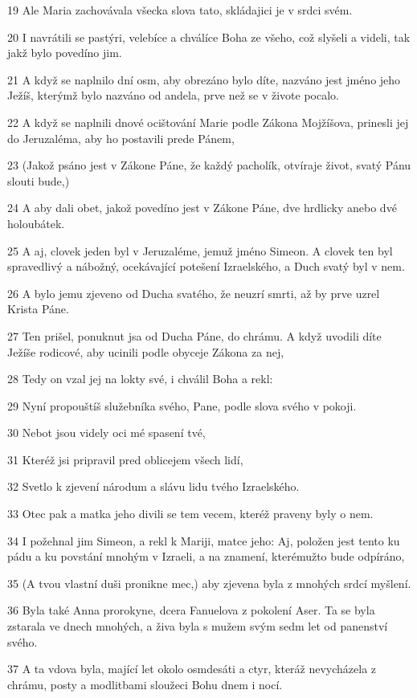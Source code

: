 \par 19 Ale Maria zachovávala všecka slova tato, skládajici je v srdci svém.
\par 20 I navrátili se pastýri, velebíce a chválíce Boha ze všeho, což slyšeli a videli, tak jakž bylo povedíno jim.
\par 21 A když se naplnilo dní osm, aby obrezáno bylo díte, nazváno jest jméno jeho Ježíš, kterýmž bylo nazváno od andela, prve než se v živote pocalo.
\par 22 A když se naplnili dnové ocištování Marie podle Zákona Mojžíšova, prinesli jej do Jeruzaléma, aby ho postavili prede Pánem,
\par 23 (Jakož psáno jest v Zákone Páne, že každý pacholík, otvíraje život, svatý Pánu slouti bude,)
\par 24 A aby dali obet, jakož povedíno jest v Zákone Páne, dve hrdlicky anebo dvé holoubátek.
\par 25 A aj, clovek jeden byl v Jeruzaléme, jemuž jméno Simeon. A clovek ten byl spravedlivý a nábožný, ocekávající potešení Izraelského, a Duch svatý byl v nem.
\par 26 A bylo jemu zjeveno od Ducha svatého, že neuzrí smrti, až by prve uzrel Krista Páne.
\par 27 Ten prišel, ponuknut jsa od Ducha Páne, do chrámu. A když uvodili díte Ježíše rodicové, aby ucinili podle obyceje Zákona za nej,
\par 28 Tedy on vzal jej na lokty své, i chválil Boha a rekl:
\par 29 Nyní propouštíš služebníka svého, Pane, podle slova svého v pokoji.
\par 30 Nebot jsou videly oci mé spasení tvé,
\par 31 Kteréž jsi pripravil pred oblicejem všech lidí,
\par 32 Svetlo k zjevení národum a slávu lidu tvého Izraelského.
\par 33 Otec pak a matka jeho divili se tem vecem, kteréž praveny byly o nem.
\par 34 I požehnal jim Simeon, a rekl k Mariji, matce jeho: Aj, položen jest tento ku pádu a ku povstání mnohým v Izraeli, a na znamení, kterémužto bude odpíráno,
\par 35 (A tvou vlastní duši pronikne mec,) aby zjevena byla z mnohých srdcí myšlení.
\par 36 Byla také Anna prorokyne, dcera Fanuelova z pokolení Aser. Ta se byla zstarala ve dnech mnohých, a živa byla s mužem svým sedm let od panenství svého.
\par 37 A ta vdova byla, mající let okolo osmdesáti a ctyr, kteráž nevycházela z chrámu, posty a modlitbami sloužeci Bohu dnem i nocí.
